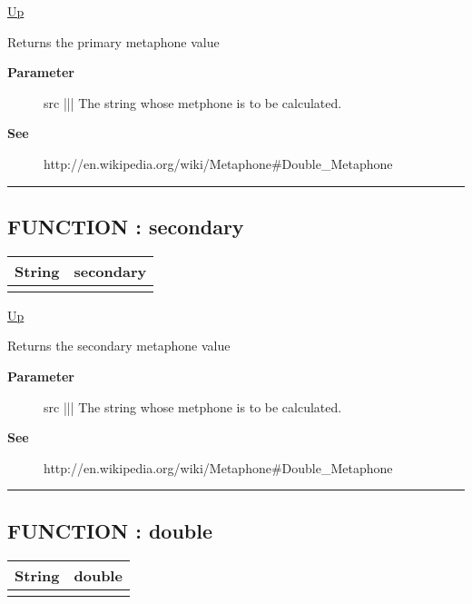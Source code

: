 \hyperlink{ecldoc:Metaphone}{Up}

\par
Returns the primary metaphone value

\par
\begin{description}
\item [\textbf{Parameter}] src ||| The string whose metphone is to be calculated.
\item [\textbf{See}] http://en.wikipedia.org/wiki/Metaphone\#Double\_Metaphone
\end{description}

\rule{\textwidth}{0.4pt}
\subsection*{FUNCTION : secondary}
\hypertarget{ecldoc:metaphone.secondary}{}

{\renewcommand{\arraystretch}{1.5}
\begin{tabularx}{\textwidth}{|>{\raggedright\arraybackslash}l|X|}
\hline
\hspace{0pt}String & secondary \\
\hline
\multicolumn{2}{|>{\raggedright\arraybackslash}X|}{\hspace{0pt}(STRING src)} \\
\hline
\end{tabularx}
}

\hyperlink{ecldoc:Metaphone}{Up}

\par
Returns the secondary metaphone value

\par
\begin{description}
\item [\textbf{Parameter}] src ||| The string whose metphone is to be calculated.
\item [\textbf{See}] http://en.wikipedia.org/wiki/Metaphone\#Double\_Metaphone
\end{description}

\rule{\textwidth}{0.4pt}
\subsection*{FUNCTION : double}
\hypertarget{ecldoc:metaphone.double}{}

{\renewcommand{\arraystretch}{1.5}
\begin{tabularx}{\textwidth}{|>{\raggedright\arraybackslash}l|X|}
\hline
\hspace{0pt}String & double \\
\hline
\multicolumn{2}{|>{\raggedright\arraybackslash}X|}{\hspace{0pt}(STRING src)} \\
\hline
\end{tabularx}
}

